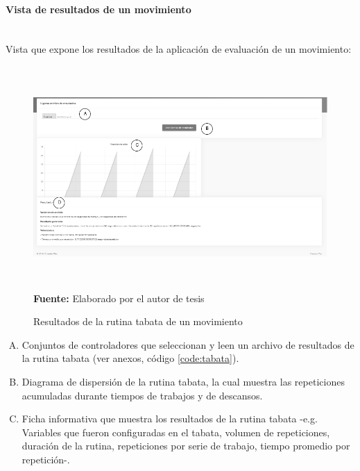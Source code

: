 \paragraph{Vista de resultados de un movimiento}\mbox{} \\ \label{ins:UI:web:result}
Vista que expone los resultados de la aplicaci\'on de evaluaci\'on de un movimiento:
\begin{figure}[H]
	\caption{Resultados de la rutina tabata de un movimiento}
	\label{fig:resultsTabata}
	\centering
	\includegraphics[width=460px,height=320px]{graphics/web-results.PNG} \\
	\textbf{Fuente:} Elaborado por el autor de tesis
\end{figure}
\begin{enumerate}[A.]
\item Conjuntos de controladores que seleccionan y leen un archivo de resultados de la rutina tabata (ver anexos, c\'odigo \ref{code:tabata}).
\item Diagrama de dispersi\'on de la rutina tabata, la cual muestra las repeticiones acumuladas durante tiempos de trabajos y de descansos.
\item Ficha informativa que muestra los resultados de la rutina tabata -e.g. Variables que fueron configuradas en el tabata, volumen de repeticiones, duraci\'on de la rutina, repeticiones por serie de trabajo, tiempo promedio por repetici\'on-.
\end{enumerate}
